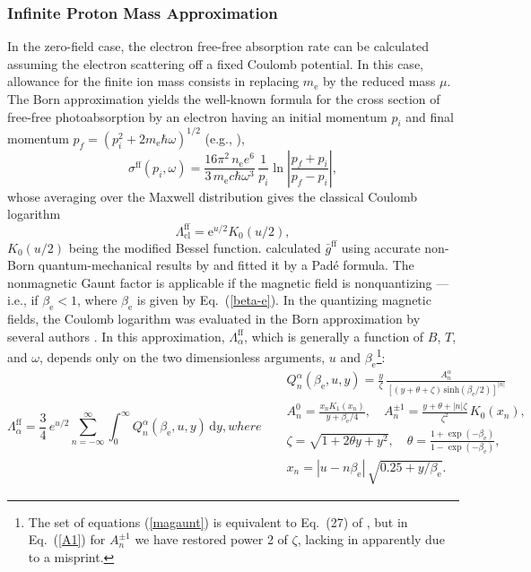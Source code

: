 \documentclass{emulateapj}
\newcommand{\beq}{\begin{equation}}
\newcommand{\eeq}{\end{equation}}
\newcommand{\req}[1]{Eq.\ (\ref{#1})}
\newcommand{\mel}{m_\mathrm{e}}
\newcommand{\dd}{\mathrm{d}}
\begin{document}
        \subsubsection{Infinite Proton Mass Approximation}
%
In the zero-field case, the electron 
free-free absorption rate can be calculated assuming 
the electron scattering off a fixed Coulomb potential.
In this case, allowance for the finite ion mass
consists in replacing $\mel$ by the reduced mass $\mu$.
The Born
approximation yields
the well-known formula for the cross section of free-free
photoabsorption by an electron having an initial momentum $p_i$
and final momentum $p_f=(p_i^2+2\mel\hbar\omega)^{1/2}$
 (e.g., \citealp{BetheSalpeter}),
\beq
   \sigma^\mathrm{ff}(p_i,\omega) = 
   \frac{16\pi^2\,n_\mathrm{e} e^6}{3\,\mel c \hbar \omega^3}\,
  \frac{1}{p_i}
   \ln\left|\frac{p_f+p_i}{p_f-p_i}\right|,
\eeq
whose averaging over the Maxwell distribution
gives the classical Coulomb logarithm
%
\beq
\Lambda_\mathrm{cl}^\mathrm{ff} = \mathrm{e}^{u/2}K_0(u/2),
\label{GauntBorn}
\eeq
%
 $K_0(u/2)$ being the modified Bessel function.
\citet{Hummer88} calculated $\bar{g}^\mathrm{ff}$
using accurate non-Born quantum-mechanical results by
\citet{KarzasLatter} and fitted
it by a Pad\'e formula.
The nonmagnetic
Gaunt factor is applicable if
the magnetic field is nonquantizing ---
i.e., if $\beta_\mathrm{e} < 1$, where  $\beta_\mathrm{e}$
is given by \req{beta-e}.
In the quantizing magnetic fields, the Coulomb logarithm
was evaluated in the Born approximation
by several authors
\citep{PavlovPanov,Nagel,Mesz}. 
In this approximation, $\Lambda_\alpha^\mathrm{ff}$, which is generally
a function of $B$, $T$, and $\omega$, depends only
on the two dimensionless arguments, $u$ and 
$\beta_\mathrm{e}$\footnote{%
      The set of equations (\ref{magaunt}) is equivalent to 
   Eq.\ (27) of \citet{PavlovPanov}, but
   in \req{A1} for $A_n^{\pm1}$
   we have restored power 2 of $\zeta$, lacking
 in \citet{PavlovPanov}
   apparently due to a misprint.
}:
\begin{subequations}
\label{magaunt}
\beq
\Lambda_\alpha^\mathrm{ff} = \frac{3}{4}\,e^{u/2}
 \sum_{n=-\infty}^\infty 
 \int_0^\infty Q_n^\alpha(\beta_\mathrm{e},u,y)
  \,\dd y,
\eeq
where
\begin{eqnarray}
&&
 Q_n^\alpha (\beta_\mathrm{e},u,y) = \frac{y}{\zeta}\,
 \frac{A_n^\alpha }{ 
 [(y+\theta+\zeta)\,\mathrm{sinh}(\beta_\mathrm{e}/2)]^{|n|}}
\\&&
A_n^{0} = \frac{x_n K_1(x_n) }{ y+\beta_\mathrm{e}/4},
\quad
A_n^{\pm1} = \frac{y+\theta+|n|\zeta }{ \zeta^2}\,K_0(x_n),
\label{A1}
\\&&
\zeta=\sqrt{1+2\theta y+y^2},
\quad
   \theta = \frac{ 1+\exp(-\beta_\mathrm{e}) }{
       1-\exp(-\beta_\mathrm{e}) } ,
\\&&
   x_n = |u-n\beta_\mathrm{e}| \,\sqrt{0.25+y/\beta_\mathrm{e}}.
\end{eqnarray}
\end{subequations}
\end{document}
